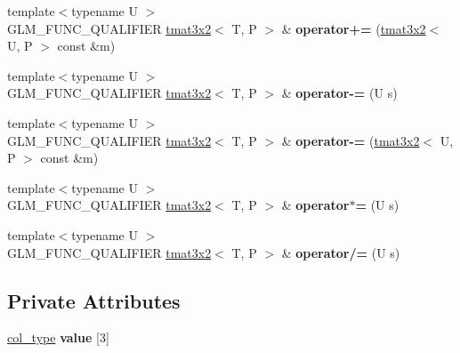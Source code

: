 \begin{DoxyCompactItemize}
\item 
{\footnotesize template$<$typename U $>$ }\\G\+L\+M\+\_\+\+F\+U\+N\+C\+\_\+\+Q\+U\+A\+L\+I\+F\+I\+ER \hyperlink{structglm_1_1detail_1_1tmat3x2}{tmat3x2}$<$ T, P $>$ \& {\bfseries operator+=} (\hyperlink{structglm_1_1detail_1_1tmat3x2}{tmat3x2}$<$ U, P $>$ const \&m)\hypertarget{structglm_1_1detail_1_1tmat3x2_aeb063f61f41be8039bf8e5b40b40ae50}{}\label{structglm_1_1detail_1_1tmat3x2_aeb063f61f41be8039bf8e5b40b40ae50}

\item 
{\footnotesize template$<$typename U $>$ }\\G\+L\+M\+\_\+\+F\+U\+N\+C\+\_\+\+Q\+U\+A\+L\+I\+F\+I\+ER \hyperlink{structglm_1_1detail_1_1tmat3x2}{tmat3x2}$<$ T, P $>$ \& {\bfseries operator-\/=} (U s)\hypertarget{structglm_1_1detail_1_1tmat3x2_af77215fb32bc46ef8b32f044ef9bdab6}{}\label{structglm_1_1detail_1_1tmat3x2_af77215fb32bc46ef8b32f044ef9bdab6}

\item 
{\footnotesize template$<$typename U $>$ }\\G\+L\+M\+\_\+\+F\+U\+N\+C\+\_\+\+Q\+U\+A\+L\+I\+F\+I\+ER \hyperlink{structglm_1_1detail_1_1tmat3x2}{tmat3x2}$<$ T, P $>$ \& {\bfseries operator-\/=} (\hyperlink{structglm_1_1detail_1_1tmat3x2}{tmat3x2}$<$ U, P $>$ const \&m)\hypertarget{structglm_1_1detail_1_1tmat3x2_a27015cfc43f110539d46ab697ce67d4b}{}\label{structglm_1_1detail_1_1tmat3x2_a27015cfc43f110539d46ab697ce67d4b}

\item 
{\footnotesize template$<$typename U $>$ }\\G\+L\+M\+\_\+\+F\+U\+N\+C\+\_\+\+Q\+U\+A\+L\+I\+F\+I\+ER \hyperlink{structglm_1_1detail_1_1tmat3x2}{tmat3x2}$<$ T, P $>$ \& {\bfseries operator$\ast$=} (U s)\hypertarget{structglm_1_1detail_1_1tmat3x2_af59d2d25557d16f13ff7fd79fa94bfd0}{}\label{structglm_1_1detail_1_1tmat3x2_af59d2d25557d16f13ff7fd79fa94bfd0}

\item 
{\footnotesize template$<$typename U $>$ }\\G\+L\+M\+\_\+\+F\+U\+N\+C\+\_\+\+Q\+U\+A\+L\+I\+F\+I\+ER \hyperlink{structglm_1_1detail_1_1tmat3x2}{tmat3x2}$<$ T, P $>$ \& {\bfseries operator/=} (U s)\hypertarget{structglm_1_1detail_1_1tmat3x2_ab8db479d66f6b4cac2c02b9e5a2e40d8}{}\label{structglm_1_1detail_1_1tmat3x2_ab8db479d66f6b4cac2c02b9e5a2e40d8}

\end{DoxyCompactItemize}
\subsection*{Private Attributes}
\begin{DoxyCompactItemize}
\item 
\hyperlink{structglm_1_1detail_1_1tvec2}{col\+\_\+type} {\bfseries value} \mbox{[}3\mbox{]}\hypertarget{structglm_1_1detail_1_1tmat3x2_a7756888f6879573d3db9caba1475e244}{}\label{structglm_1_1detail_1_1tmat3x2_a7756888f6879573d3db9caba1475e244}

\end{DoxyCompactItemize}



